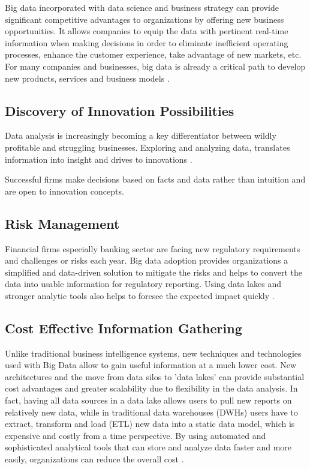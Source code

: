 \documentclass[sigconf]{acmart}
\begin{document}
Big data incorporated with data science and business strategy can provide significant competitive advantages to organizations by offering new business opportunities. It allows companies to equip the data with pertinent real-time information when making decisions in order to eliminate inefficient operating processes, enhance the customer experience, take advantage of new markets, etc. For many companies and businesses, big data is already a critical path to develop new products, services and business models \cite{accenture-next-generation-financial}.

\subsection{Discovery of Innovation Possibilities}
Data analysis is increasingly becoming a key differentiator between wildly profitable and struggling businesses. Exploring and analyzing data, translates information into insight and drives to innovations \cite{bigdata-innovations}.

Successful firms make decisions based on facts and data rather than intuition and are open to innovation concepts. 


\subsection{Risk Management}
Financial firms especially banking sector are facing new regulatory requirements and challenges or risks each year. Big data adoption provides organizations a simplified and data-driven solution to mitigate the risks and helps to convert the data into usable information for regulatory reporting. Using data lakes and stronger analytic tools   also helps to foresee the expected impact quickly \cite{the-real-world-use-of-big-data-935}.

\subsection{Cost Effective Information Gathering}

Unlike traditional business intelligence systems, new techniques and technologies used with Big Data allow to gain useful information at a much lower cost. New architectures and the move from data silos to 'data lakes' can provide substantial cost advantages and greater scalability due to flexibility in the data analysis. In fact, having all data sources in a data lake allows users to pull new reports on relatively new data, while in traditional data warehouses (DWHs) users have to extract, transform and load (ETL) new data into a static data model, which is expensive and costly from a time perspective. By using automated and sophisticated analytical tools that can store and analyze data faster and more easily, organizations can reduce the overall cost \cite{accenture-next-generation-financial}.
\end{document}
